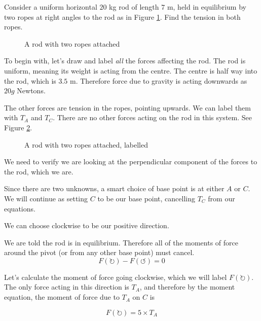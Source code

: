 \begin{example}
    Consider a uniform horizontal $20$ kg rod of length $7$ m, held in equilibrium by two ropes at right angles to the rod as in Figure \ref{fig:moment_two_rods}. Find the tension in both ropes.
    \begin{figure}[H]
    \centering
    \caption{A rod with two ropes attached}
    \label{fig:moment_two_rods}
    \end{figure}

\end{example}
\begin{solution}

    To begin with, let's draw and label \emph{all} the forces affecting the rod. 
    The rod is uniform, meaning its weight is acting from the centre. The centre is half way into the rod, which is $3.5$ m. Therefore force due to gravity is acting downwards 
    as $20g$ Newtons.

    The other forces are tension in the ropes, pointing upwards. We can label them with $T_A$ and $T_C$. There are no other forces acting on the rod in this system.
    See Figure \ref{fig:moment_two_rods_labelled}.

    \begin{figure}[H]
    \centering
    \caption{A rod with two ropes attached, labelled}
    \label{fig:moment_two_rods_labelled}
    \end{figure}

    We need to verify we are looking at the perpendicular component of the forces to the rod, which we are.

    Since there are two unknowns, a smart choice of base point is at either $A$ or $C$. We will continue as setting $C$ to be our base point, cancelling $T_C$ from our equations.

    We can choose clockwise to be our positive direction. 

    We are told the rod is in equilibrium. Therefore all of the moments of force around the pivot (or from any other base point) must cancel.
    \[ F(\circlearrowright) - F(\circlearrowleft) = 0\]

    Let's calculate the moment of force going clockwise, which we will label $F(\circlearrowright)$. The only force acting in this direction is $T_A$, and therefore by the moment equation, the moment of force due to $T_A$ on $C$ is

    \[ F(\circlearrowright) = 5 \times T_A \]


\end{solution}
